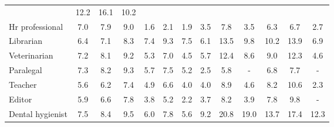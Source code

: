 \begin{table*}[p]
{\begin{tabular}{l|ccc|ccc|ccc|ccc}
& \cellcolor{orange5} 12.2 & \cellcolor{orange6} 16.1 & \cellcolor{orange4} 10.2
\\
Hr professional
& \cellcolor{orange3} 7.0 & \cellcolor{orange3} 7.9 & \cellcolor{orange3} 9.0
& \cellcolor{orange1} 1.6 & \cellcolor{orange1} 2.1 & \cellcolor{blue1} 1.9
& \cellcolor{orange1} 3.5 & \cellcolor{orange3} 7.8 & \cellcolor{orange1} 3.5
& \cellcolor{orange2} 6.3 & \cellcolor{orange3} 6.7 & \cellcolor{blue1} 2.7
\\
Librarian
& \cellcolor{orange2} 6.4 & \cellcolor{orange3} 7.1 & \cellcolor{orange3} 8.3
& \cellcolor{orange3} 7.4 & \cellcolor{orange4} 9.3 & \cellcolor{orange3} 7.5
& \cellcolor{orange2} 6.1 & \cellcolor{orange5} 13.5 & \cellcolor{orange4} 9.8
& \cellcolor{orange4} 10.2 & \cellcolor{orange5} 13.9 & \cellcolor{orange3} 6.9
\\
Veterinarian
& \cellcolor{orange3} 7.2 & \cellcolor{orange3} 8.1 & \cellcolor{orange4} 9.2
& \cellcolor{orange2} 5.3 & \cellcolor{orange3} 7.0 & \cellcolor{orange2} 4.5
& \cellcolor{orange2} 5.7 & \cellcolor{orange5} 12.4 & \cellcolor{orange3} 8.6
& \cellcolor{orange3} 9.0 & \cellcolor{orange5} 12.3 & \cellcolor{orange2} 4.6
\\
Paralegal
& \cellcolor{orange3} 7.3 & \cellcolor{orange3} 8.2 & \cellcolor{orange4} 9.3
& \cellcolor{orange2} 5.7 & \cellcolor{orange3} 7.5 & \cellcolor{orange2} 5.2
& \cellcolor{orange1} 2.5 & \cellcolor{orange2} 5.8 & \cellcolor{lightgray} -
& \cellcolor{orange3} 6.8 & \cellcolor{orange3} 7.7 & \cellcolor{lightgray} -
\\
Teacher
& \cellcolor{orange2} 5.6 & \cellcolor{orange2} 6.2 & \cellcolor{orange3} 7.4
& \cellcolor{orange2} 4.9 & \cellcolor{orange3} 6.6 & \cellcolor{orange2} 4.0
& \cellcolor{orange2} 4.0 & \cellcolor{orange3} 8.9 & \cellcolor{orange2} 4.6
& \cellcolor{orange3} 8.2 & \cellcolor{orange4} 10.6 & \cellcolor{orange1} 2.3
\\
Editor
& \cellcolor{orange2} 5.9 & \cellcolor{orange3} 6.6 & \cellcolor{orange3} 7.8
& \cellcolor{orange1} 3.8 & \cellcolor{orange2} 5.2 & \cellcolor{orange1} 2.2
& \cellcolor{orange1} 3.7 & \cellcolor{orange3} 8.2 & \cellcolor{orange2} 3.9
& \cellcolor{orange3} 7.8 & \cellcolor{orange4} 9.8 & \cellcolor{lightgray} -
\\
Dental hygienist
& \cellcolor{orange3} 7.5 & \cellcolor{orange3} 8.4 & \cellcolor{orange4} 9.5
& \cellcolor{orange2} 6.0 & \cellcolor{orange3} 7.8 & \cellcolor{orange2} 5.6
& \cellcolor{orange4} 9.2 & \cellcolor{orange8} 20.8 & \cellcolor{orange7} 19.0
& \cellcolor{orange5} 13.7 & \cellcolor{orange7} 17.4 & \cellcolor{orange5} 12.3

\end{tabular}}
\end{table*}

